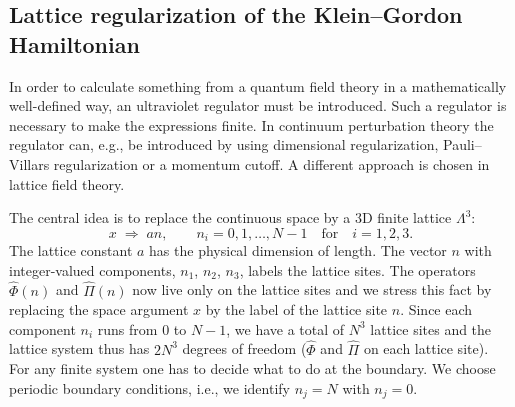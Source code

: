 \subsection{Lattice regularization of the Klein--Gordon Hamiltonian}

In order to calculate something from a quantum field theory in a mathematically
well-defined way, an ultraviolet regulator must be introduced. Such a regulator
is necessary to make the expressions finite. In continuum perturbation theory
the regulator can, e.g., be introduced by using dimensional regularization,
Pauli--Villars regularization or a momentum cutoff. A different approach is
chosen in lattice field theory.

The central idea is to replace the continuous space by a 3D finite lattice
$\Lambda^3$:
\begin{equation}
  x \;\Rightarrow\; an, \qquad n_i = 0, 1, \ldots, N-1
  \quad \text{for} \quad i = 1, 2, 3.
\end{equation}
The lattice constant $a$ has the physical dimension of length. The vector $n$
with integer-valued components, $n_1$, $n_2$, $n_3$, labels the lattice sites.
The operators $\hat{\Phi}(n)$ and $\hat{\Pi}(n)$ now live only on the lattice
sites and we stress this fact by replacing the space argument $x$ by the label
of the lattice site $n$. Since each component $n_i$ runs from 0 to $N-1$, we
have a total of $N^3$ lattice sites and the lattice system thus has $2N^3$
degrees of freedom ($\hat{\Phi}$ and $\hat{\Pi}$ on each lattice site). For any
finite system one has to decide what to do at the boundary. We choose periodic
boundary conditions, i.e., we identify $n_j = N$ with $n_j = 0$.

